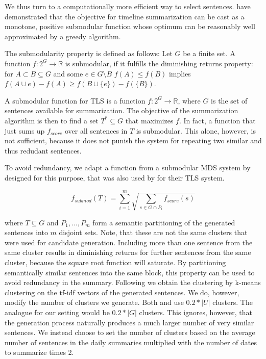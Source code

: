 \documentclass[a4paper,BCOR=10mm]{report}
\numberwithin{lemma}{chapter}
\numberwithin{definition}{chapter}
\begin{document}

We thus turn to a computationally more efficient way to select sentences.
\citet{markert} have demonstrated that the objective for timeline summarization can be cast as a monotone, positive submodular function whose optimum can be reasonably well approximated by a greedy algorithm.

The submodularity property is defined as follows:
 Let $G$ be a finite set. A function $f: 2^{G} \rightarrow \mathbb{R}$ is submodular, if it fulfills the diminishing returns property: for $A \subset B \subseteq G$ and some $e \in G \setminus B$ $f(A) \leq f(B)$ implies $f(A \cup e) - f(A) \geq f(B \cup \{e\}) - f(\{B\})$.

A submodular function for TLS is a function $f: 2^{G} \rightarrow \mathbb{R}$, where $G$ is the set of sentences available for summarization.
The objective of the summarization algorithm is then to find a set $T^{*} \subseteq G$ that maximizes $f$.
In fact, a function that just sums up $f_{\mathit{score}}$ over all sentences in $T$ is submodular. This alone, however, is not sufficient, because it does not punish the system for repeating two similar and thus redudant sentences.

To avoid redundancy, we adapt a function from a submodular MDS system by \citet{lin+blimes} designed for this purpose, that was also used by \citet{markert} for their TLS system.

\begin{equation}
f_{\mathit{submod}}(T) = \sum_{i = 1}^{m} \sqrt{\sum_{s \in G \cap P_i} f_{\mathit{score}}(s)}
\end{equation}

where $T \subseteq G$ and $P_1, ..., P_m$ form a semantic partitioning of the generated sentences into $m$ disjoint sets. Note, that these are not the same clusters that were used for candidate generation. Including more than one sentence from the same cluster results in diminishing returns for further sentences from the same cluster, because the square root function will saturate.
By partitioning semantically similar sentences into the same block, this property can be used to avoid redundancy in the summary.
Following \citet{lin+blimes} we obtain the clustering by k-means clustering on the tf-idf vectors of the generated sentences. We do, however, modify the number of clusters we generate. Both \citet{lin+blimes} and \citet{markert} use $0.2 * |U|$ clusters. The analogue for our setting would be $0.2 * |G|$ clusters. This ignores, however, that the generation process naturally produces a much larger number of very similar sentences. We instead choose to set the number of clusters based on the average number of sentences in the daily summaries multiplied with the number of dates to summarize times 2.
\end{document}
